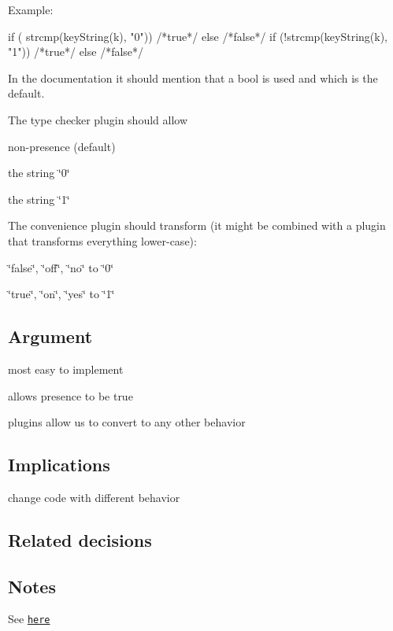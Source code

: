 Example\+: \begin{DoxyVerb}if ( strcmp(keyString(k), "0")) {/*true*/} else {/*false*/}
if (!strcmp(keyString(k), "1")) {/*true*/} else {/*false*/}
\end{DoxyVerb}


In the documentation it should mention that a bool is used and which is the default.

The type checker plugin should allow


\begin{DoxyItemize}
\item non-\/presence (default)
\item the string \char`\"{}0\char`\"{}
\item the string \char`\"{}1\char`\"{}
\end{DoxyItemize}

The convenience plugin should transform (it might be combined with a plugin that transforms everything lower-\/case)\+:


\begin{DoxyItemize}
\item \char`\"{}false\char`\"{}, \char`\"{}off\char`\"{}, \char`\"{}no\char`\"{} to \char`\"{}0\char`\"{}
\item \char`\"{}true\char`\"{}, \char`\"{}on\char`\"{}, \char`\"{}yes\char`\"{} to \char`\"{}1\char`\"{}
\end{DoxyItemize}

\subsection*{Argument}


\begin{DoxyItemize}
\item most easy to implement
\item allows presence to be true
\item plugins allow us to convert to any other behavior
\end{DoxyItemize}

\subsection*{Implications}


\begin{DoxyItemize}
\item change code with different behavior
\end{DoxyItemize}

\subsection*{Related decisions}

\subsection*{Notes}

See \href{https://github.com/ElektraInitiative/libelektra/issues/308}{\tt here} 